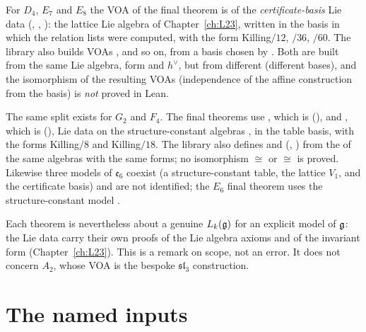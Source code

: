 \begin{warning}[title={Scope: which VOA is meant for $G_2$, $D_4$, $F_4$, $E_6$, $E_7$, $E_8$}]\label{l27:warn:scope}
For $D_4$, $E_7$ and $E_8$ the VOA of the final theorem is  of the \emph{certificate-basis} Lie data
(, , ): the lattice Lie algebra of Chapter~\ref{ch:L23}, written in
the basis in which the relation lists were computed, with the form Killing$/12$, $/36$, $/60$. The library also builds
VOAs , and so on, from a basis chosen by . Both are built from the same Lie
algebra, form and $h^\vee$, but from different  (different bases), and the isomorphism of the resulting
VOAs (independence of the affine construction from the basis) is \emph{not} proved in Lean.

The same split exists for $G_2$ and $F_4$. The final theorems use , which is
 (), and , which is
 (), Lie data on the
structure-constant algebras ,  in the table basis, with the forms Killing$/8$ and Killing$/18$. The
library also defines  and  (,
) from the  of the same algebras with the same forms; no isomorphism
 $\cong$  or  $\cong$  is proved. Likewise three models of
$\mathfrak e_6$ coexist (a structure-constant table, the lattice $V_1$, and the  certificate basis) and are not
identified; the $E_6$ final theorem uses the structure-constant model .

Each theorem is nevertheless about a genuine $L_k(\mathfrak g)$ for an explicit model of $\mathfrak g$: the Lie data carry
their own proofs of the Lie algebra axioms and of the invariant form (Chapter~\ref{ch:L23}). This is a remark on scope, not an
error. It does not concern $A_2$, whose VOA is the bespoke $\mathfrak{sl}_3$ construction.
\end{warning}

\section{The named inputs}\label{l27:sec:inputs}

